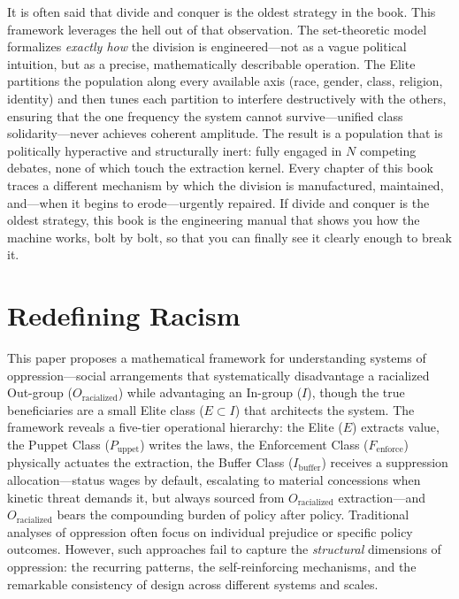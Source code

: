 \documentclass[12pt,openany]{book}
\begin{document}
It is often said that divide and conquer is the oldest strategy in the book. This framework leverages the hell out of that observation. The set-theoretic model formalizes \textit{exactly how} the division is engineered---not as a vague political intuition, but as a precise, mathematically describable operation. The Elite partitions the population along every available axis (race, gender, class, religion, identity) and then tunes each partition to interfere destructively with the others, ensuring that the one frequency the system cannot survive---unified class solidarity---never achieves coherent amplitude. The result is a population that is politically hyperactive and structurally inert: fully engaged in $N$ competing debates, none of which touch the extraction kernel. Every chapter of this book traces a different mechanism by which the division is manufactured, maintained, and---when it begins to erode---urgently repaired. If divide and conquer is the oldest strategy, this book is the engineering manual that shows you how the machine works, bolt by bolt, so that you can finally see it clearly enough to break it.

\mainmatter
\chapter{Redefining Racism}

This paper proposes a mathematical framework for understanding systems of oppression---social arrangements that systematically disadvantage a racialized Out-group ($O_{\text{racialized}}$) while advantaging an In-group ($I$), though the true beneficiaries are a small Elite class ($E \subset I$) that architects the system. The framework reveals a five-tier operational hierarchy: the Elite ($E$) extracts value, the Puppet Class ($P_{\text{uppet}}$) writes the laws, the Enforcement Class ($F_{\text{enforce}}$) physically actuates the extraction, the Buffer Class ($I_{\text{buffer}}$) receives a suppression allocation---status wages by default, escalating to material concessions when kinetic threat demands it, but always sourced from $O_{\text{racialized}}$ extraction---and $O_{\text{racialized}}$ bears the compounding burden of policy after policy. Traditional analyses of oppression often focus on individual prejudice or specific policy outcomes. However, such approaches fail to capture the \textit{structural} dimensions of oppression: the recurring patterns, the self-reinforcing mechanisms, and the remarkable consistency of design across different systems and scales.
\end{document}
